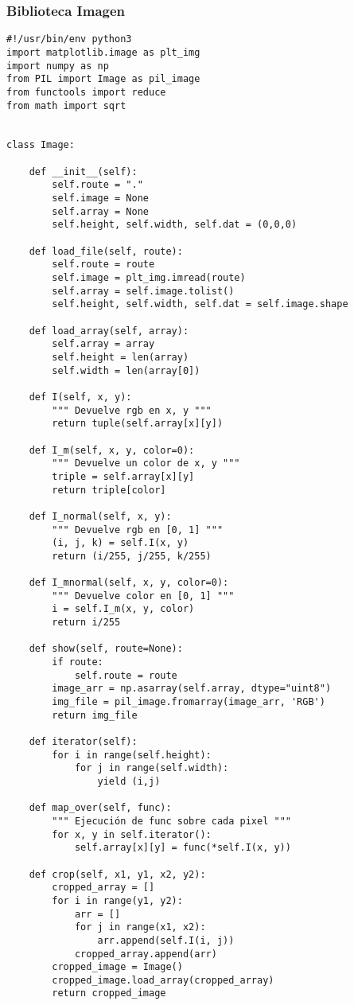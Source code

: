 \documentclass[letter]{article}
\begin{document}
\subsubsection{Biblioteca Imagen}
\label{sec:orgf65bad8}
\begin{verbatim}
#!/usr/bin/env python3
import matplotlib.image as plt_img
import numpy as np
from PIL import Image as pil_image
from functools import reduce
from math import sqrt


class Image:

    def __init__(self):
        self.route = "."
        self.image = None
        self.array = None
        self.height, self.width, self.dat = (0,0,0)

    def load_file(self, route):
        self.route = route
        self.image = plt_img.imread(route)
        self.array = self.image.tolist()
        self.height, self.width, self.dat = self.image.shape

    def load_array(self, array):
        self.array = array
        self.height = len(array)
        self.width = len(array[0])

    def I(self, x, y):
        """ Devuelve rgb en x, y """
        return tuple(self.array[x][y])

    def I_m(self, x, y, color=0):
        """ Devuelve un color de x, y """
        triple = self.array[x][y]
        return triple[color]

    def I_normal(self, x, y):
        """ Devuelve rgb en [0, 1] """
        (i, j, k) = self.I(x, y)
        return (i/255, j/255, k/255)

    def I_mnormal(self, x, y, color=0):
        """ Devuelve color en [0, 1] """
        i = self.I_m(x, y, color)
        return i/255

    def show(self, route=None):
        if route:
            self.route = route
        image_arr = np.asarray(self.array, dtype="uint8")
        img_file = pil_image.fromarray(image_arr, 'RGB')
        return img_file

    def iterator(self):
        for i in range(self.height):
            for j in range(self.width):
                yield (i,j)

    def map_over(self, func):
        """ Ejecución de func sobre cada pixel """
        for x, y in self.iterator():
            self.array[x][y] = func(*self.I(x, y))

    def crop(self, x1, y1, x2, y2):
        cropped_array = []
        for i in range(y1, y2):
            arr = []
            for j in range(x1, x2):
                arr.append(self.I(i, j))
            cropped_array.append(arr)
        cropped_image = Image()
        cropped_image.load_array(cropped_array)
        return cropped_image



\end{verbatim}
\end{document}

